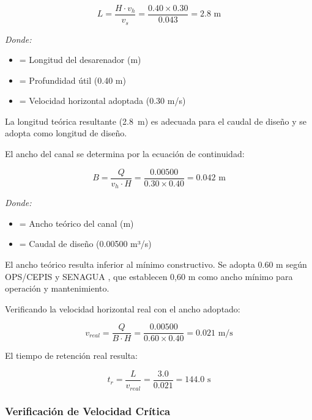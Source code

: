 \documentclass[12pt,a4paper]{article}
\begin{document}
\begin{equation}
L = \frac{H \cdot v_h}{v_s} = \frac{0.40 \times 0.30}{0.043} = 2.8 \text{ m}
\end{equation}

\textit{Donde:}
\begin{itemize}[noitemsep,leftmargin=2em]
    \item[$L$] = Longitud del desarenador (m)
    \item[$H$] = Profundidad útil (0.40 m)
    \item[$v_h$] = Velocidad horizontal adoptada (0.30 m/s)
\end{itemize}

La longitud teórica resultante (2.8~m) es adecuada para el caudal de diseño y se adopta como longitud de diseño.

El ancho del canal se determina por la ecuación de continuidad:

\begin{equation}
B = \frac{Q}{v_h \cdot H} = \frac{0.00500}{0.30 \times 0.40} = 0.042 \text{ m}
\end{equation}

\textit{Donde:}
\begin{itemize}[noitemsep,leftmargin=2em]
    \item[$B$] = Ancho teórico del canal (m)
    \item[$Q$] = Caudal de diseño (0.00500 m³/s)
\end{itemize}

El ancho teórico resulta inferior al mínimo constructivo. Se adopta 0.60 m según OPS/CEPIS \cite{ops2005} y SENAGUA \cite{senagua2012}, que establecen 0,60 m como ancho mínimo para operación y mantenimiento.

Verificando la velocidad horizontal real con el ancho adoptado:

\begin{equation}
v_{real} = \frac{Q}{B \cdot H} = \frac{0.00500}{0.60 \times 0.40} = 0.021 \text{ m/s}
\end{equation}

El tiempo de retención real resulta:

\begin{equation}
t_r = \frac{L}{v_{real}} = \frac{3.0}{0.021} = 144.0 \text{ s}
\end{equation}

\subsubsection{Verificación de Velocidad Crítica}
\end{document}
